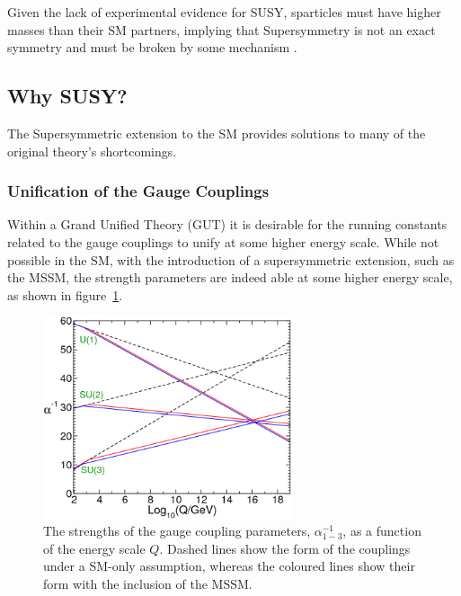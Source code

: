 Given the lack of experimental evidence for SUSY, sparticles must
have higher masses than their SM partners, implying that Supersymmetry is not
an exact symmetry and must be broken by some mechanism \cite{ref:hierarchy1,ref:hierarchy2}.

\subsection{Why SUSY?}
The Supersymmetric extension to the SM provides solutions to many of the
original theory's shortcomings.

\subsubsection{Unification of the Gauge Couplings}
Within a Grand Unified Theory (GUT) it is desirable
for the running constants related to the gauge couplings to unify at some
higher energy scale. While not possible in the SM, with the introduction of a
supersymmetric extension, such as the MSSM, the strength parameters are indeed able at
some higher energy scale, as shown in figure~\ref{fig:uni_gauge}.

\begin{figure}[h!]
  \centering
  \includegraphics[width=0.65\textwidth]{Figs/susy/unification_primer.png}
  \caption{The strengths of the gauge coupling parameters,
  $\alpha^{-1}_{1-3}$, as a function of the energy scale $Q$. Dashed lines
  show the form of the couplings under a SM-only assumption, whereas the coloured
  lines show their form with the inclusion of the MSSM. \cite{Martin:1997ns}}
  \label{fig:uni_gauge}
\end{figure}

